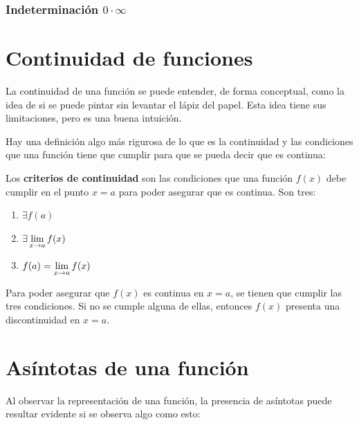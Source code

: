 \documentclass[sans]{apuntes}
\begin{document}
\subsubsection{Indeterminación \texorpdfstring{$0 \cdot \infty$}{0·∞}}

\section{Continuidad de funciones}
La continuidad de una función se puede entender, de forma conceptual, como la idea de si se puede pintar sin levantar el lápiz del papel. Esta idea tiene sus limitaciones, pero es una buena intuición.
\par Hay una definición algo más rigurosa de lo que es la continuidad y las condiciones que una función tiene que cumplir para que se pueda decir que es continua:
\par Los \textbf{criterios de continuidad} son las condiciones que una función $f(x)$ debe cumplir en el punto $x = a$ para poder asegurar que es continua. Son tres:
\begin{enumerate}
	\item \(\exists f(a) \)
	\item \(\exists \displaystyle\lim_{x \to a}f(x) \)
	\item \(f(a) = \displaystyle\lim_{x \to a}f(x)\)
\end{enumerate}

Para poder asegurar que $f(x)$ es continua en $x = a$, se tienen que cumplir las tres condiciones. Si no se cumple alguna de ellas, entonces $f(x)$ presenta una discontinuidad en $x=a$.


\section{Asíntotas de una función}
Al observar la representación de una función, la presencia de asíntotas puede resultar evidente si se observa algo como esto:
\begin{figure}[ht]
	\centering
	\hfill
\end{figure}
\end{document}
